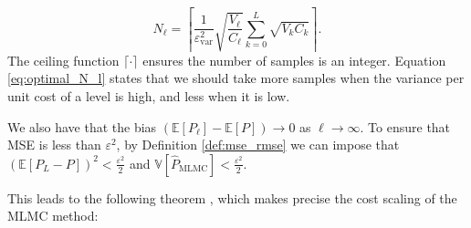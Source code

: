 \begin{equation}\label{eq:optimal_N_l}
    N_\ell = \left\lceil \frac{1}{\varepsilon_{\text{var}}^2} \sqrt{\frac{V_\ell}{C_\ell}} \sum_{k=0}^L \sqrt{V_k C_k} \right\rceil.
\end{equation}
The ceiling function $\lceil \cdot \rceil$ ensures the number of samples is an integer.
Equation \eqref{eq:optimal_N_l} states that we should take more samples when the 
variance per unit cost of a level is high, and less when it is low.


We also have that the bias $(\mathbb{E}[P_\ell] - \mathbb{E}[P]) \to 0$ as $\ell \to \infty$. 
To ensure that MSE is less than $\varepsilon^2$, by Definition \ref{def:mse_rmse} we can 
impose that 
$(\mathbb{E}[P_L  - P])^2 < \frac{\varepsilon^2}{2}$ and 
$\mathbb{V}[\hat{P}_{\mathrm{MLMC}}] < \frac{\varepsilon^2}{2}$. 

This leads to the following theorem \cite{giles2015multilevel}, which makes 
precise the cost scaling of the MLMC method:

